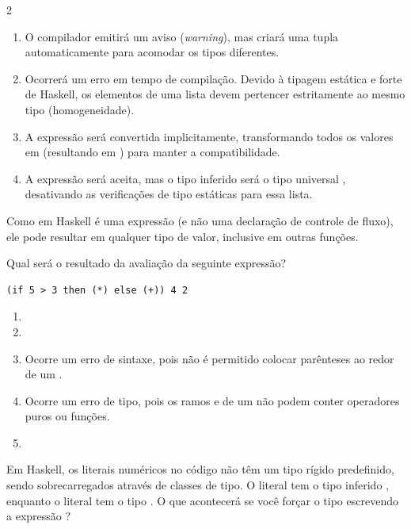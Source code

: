 \documentclass[a4paper,10pt,brazil]{article}
\begin{document}
\begin{multicols}{2}
\begin{enumerate}
  \item O compilador emitirá um aviso (\emph{warning}), mas criará uma tupla automaticamente para acomodar os tipos diferentes.

  \item Ocorrerá um erro em tempo de compilação. Devido à tipagem estática e forte de Haskell, os elementos de uma lista devem pertencer estritamente ao mesmo tipo (homogeneidade).

  \item A expressão será convertida implicitamente, transformando todos os valores em  (resultando em ) para manter a compatibilidade.

  \item A expressão será aceita, mas o tipo inferido será o tipo universal , desativando as verificações de tipo estáticas para essa lista.


\end{enumerate}

Como  em Haskell é uma expressão (e não uma declaração de controle de fluxo), ele pode resultar em qualquer tipo de valor, inclusive em outras funções. 

Qual será o resultado da avaliação da seguinte expressão?
\begin{verbatim}
(if 5 > 3 then (*) else (+)) 4 2
\end{verbatim}

\begin{enumerate}
  \item {}

  \item {}

  \item Ocorre um erro de sintaxe, pois não é permitido colocar parênteses ao redor de um .

  \item Ocorre um erro de tipo, pois os ramos  e  de um  não podem conter operadores puros ou funções.

  \item {}


\end{enumerate}

Em Haskell, os literais numéricos no código não têm um tipo rígido predefinido, sendo sobrecarregados através de classes de tipo. O literal  tem o tipo inferido , enquanto o literal  tem o tipo . 
O que acontecerá se você forçar o tipo escrevendo a expressão ?


\end{multicols}
\end{document}
